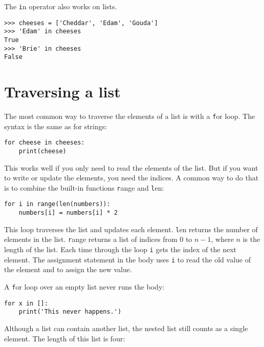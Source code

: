 \documentclass[
DIV=11,
fontsize=12,
twoside,
headinclude=false,
titlepage=firstiscover,
abstract=true,
headsepline=true,
footsepline=true,
chapterprefix=true, %
headings=big,
bibliography=totoc,%
captions=tableheading
]{scrbook}
\theoremstyle{definition}
\begin{document}

The {\texttt in} operator also works on lists.

\begin{lstlisting}
>>> cheeses = ['Cheddar', 'Edam', 'Gouda']
>>> 'Edam' in cheeses
True
>>> 'Brie' in cheeses
False
\end{lstlisting}


\section{Traversing a list}

The most common way to traverse the elements of a list is
with a {\texttt for} loop.  The syntax is the same as for strings:

\begin{lstlisting}
for cheese in cheeses:
    print(cheese)
\end{lstlisting}
%
This works well if you only need to read the elements of the
list.  But if you want to write or update the elements, you
need the indices.  A common way to do that is to combine
the built-in functions {\texttt range} and {\texttt len}:

\begin{lstlisting}
for i in range(len(numbers)):
    numbers[i] = numbers[i] * 2
\end{lstlisting}
%
This loop traverses the list and updates each element.  {\texttt len}
returns the number of elements in the list.  {\texttt range} returns
a list of indices from 0 to $n-1$, where $n$ is the length of
the list.  Each time through the loop {\texttt i} gets the index
of the next element.  The assignment statement in the body uses
{\texttt i} to read the old value of the element and to assign the
new value.

A {\texttt for} loop over an empty list never runs the body:

\begin{lstlisting}
for x in []:
    print('This never happens.')
\end{lstlisting}
%
Although a list can contain another list, the nested
list still counts as a single element.  The length of this list is
four:
\end{document}
